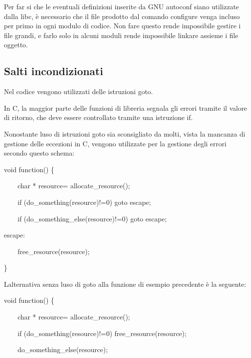 \documentclass[a4paper,11pt]{article}
\begin{document}
{\sffamily
Per far si che le eventuali definizioni inserite da GNU autoconf siano
utilizzate dalla libc, \`e necessario che il file prodotto dal comando
configure venga incluso per primo in ogni modulo di codice. Non fare
questo rende impossibile gestire i file grandi, e farlo solo in alcuni
moduli rende impossibile linkare assieme i file oggetto.}


\bigskip

\subsection{Salti incondizionati}
{\sffamily
Nel codice vengono utilizzati delle istruzioni goto.}

{\sffamily
In C, la maggior parte delle funzioni di libreria segnala gli errori
tramite il valore di ritorno, che deve essere controllato tramite una
istruzione if.}


\bigskip

{\sffamily
Nonostante l{\textquotesingle}uso di istruzioni goto sia sconsigliato da
molti, vista la mancanza di gestione delle eccezioni in C, vengono
utilizzate per la gestione degli errori secondo questo schema:}


\bigskip

{\ttfamily
void function() \{}

{\ttfamily
\ \ \ \ char * resource= allocate\_resource();}


\bigskip

{\ttfamily
\ \ \ \ if (do\_something(resource)!=0) goto escape;}

{\ttfamily
\ \ \ \ if (do\_something\_else(resource)!=0) goto escape;}


\bigskip

{\ttfamily
escape:}

{\ttfamily
\ \ \ \ free\_resource(resource);}

{\ttfamily
\}}


\bigskip

{\sffamily
L{\textquotesingle}alternativa senza l{\textquotesingle}uso di goto alla
funzione di esempio precedente \`e la seguente:}

{\ttfamily
void function() \{}

{\ttfamily
\ \ \ \ char * resource= allocate\_resource();}


\bigskip

{\ttfamily
\ \ \ \ if (do\_something(resource)!=0) free\_resource(resource);}

{\ttfamily
\ \ \ \ do\_something\_else(resource);}
\end{document}
